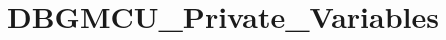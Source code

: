 \hypertarget{group___d_b_g_m_c_u___private___variables}{\section{D\-B\-G\-M\-C\-U\-\_\-\-Private\-\_\-\-Variables}
\label{group___d_b_g_m_c_u___private___variables}
}

